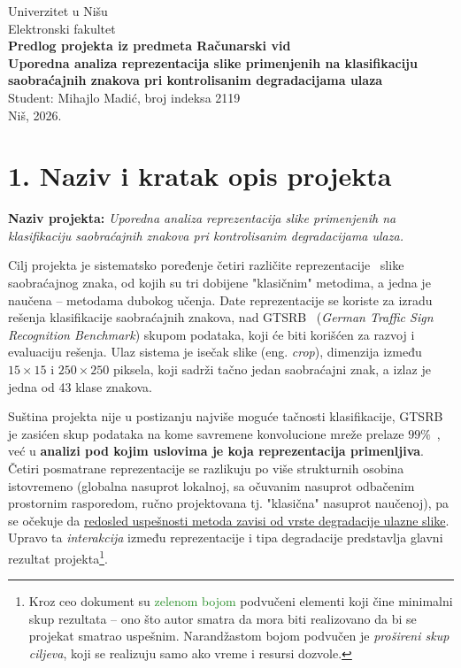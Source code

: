 \documentclass[11pt,a4paper]{article}
\newcommand{\mvp}[1]{{\setulcolor{ForestGreen}\ul{#1}}}
\begin{document}
\begin{center}
{\Large Univerzitet u Nišu\\Elektronski fakultet}\\[1.2cm]
{\LARGE \textbf{Predlog projekta iz predmeta Računarski vid}}\\[0.6cm]
{\Large \textbf{Uporedna analiza reprezentacija slike primenjenih na klasifikaciju saobraćajnih znakova pri kontrolisanim degradacijama ulaza}}\\[1.2cm]
{\large Student: Mihajlo Madić, broj indeksa 2119}\\[0.3cm]
{\large Niš, 2026.}
\end{center}

\vspace{0.6cm}

\section*{1. Naziv i kratak opis projekta}

\textbf{Naziv projekta:} \textit{Uporedna analiza reprezentacija slike primenjenih na klasifikaciju saobraćajnih znakova pri kontrolisanim degradacijama ulaza.}

Cilj projekta je sistematsko poređenje četiri različite reprezentacije~\cite{repr-learning} slike saobraćajnog znaka, od kojih su tri dobijene "klasičnim" metodima, a jedna je naučena -- metodama dubokog učenja. Date reprezentacije se koriste za izradu rešenja klasifikacije saobraćajnih znakova, nad GTSRB~\cite{gtsrb} (\textit{German Traffic Sign Recognition Benchmark}) skupom podataka, koji će biti korišćen za razvoj i evaluaciju rešenja. Ulaz sistema je isečak slike (eng. \textit{crop}), dimenzija između $15\times15$ i $250\times250$ piksela, koji sadrži tačno jedan saobraćajni znak, a izlaz je jedna od 43 klase znakova.

Suština projekta nije u postizanju najviše moguće tačnosti klasifikacije, GTSRB je zasićen skup podataka na kome savremene konvolucione mreže prelaze $99\%$~\cite{ciresan}, već u \textbf{analizi pod kojim uslovima je koja reprezentacija primenljiva}. Četiri posmatrane reprezentacije se razlikuju po više strukturnih osobina istovremeno (globalna nasuprot lokalnoj, sa očuvanim nasuprot odbačenim prostornim rasporedom, ručno projektovana tj. "klasična" nasuprot naučenoj), pa se očekuje da \mvp{redosled uspešnosti metoda zavisi od vrste degradacije ulazne slike}. Upravo ta \textit{interakcija} između reprezentacije i tipa degradacije predstavlja glavni rezultat projekta\footnote{Kroz ceo dokument su \textcolor{ForestGreen}{zelenom bojom} podvučeni elementi koji čine minimalni skup rezultata -- ono što autor smatra da mora biti realizovano da bi se projekat smatrao uspešnim. \textcolor{BurntOrange}{Narandžastom bojom} podvučen je \emph{prošireni skup ciljeva}, koji se realizuju samo ako vreme i resursi dozvole.}. 
\end{document}
